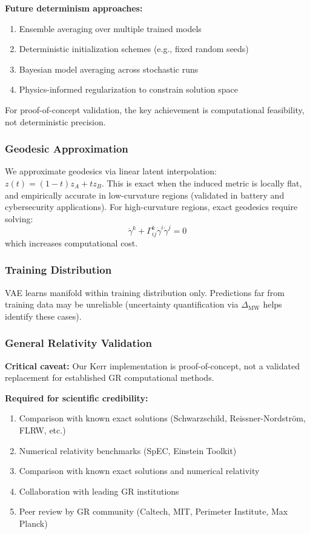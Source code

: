 \documentclass[11pt,a4paper]{article}
\begin{document}
\textbf{Future determinism approaches:}
\begin{enumerate}
\item Ensemble averaging over multiple trained models
\item Deterministic initialization schemes (e.g., fixed random seeds)
\item Bayesian model averaging across stochastic runs
\item Physics-informed regularization to constrain solution space
\end{enumerate}

For proof-of-concept validation, the key achievement is computational feasibility, not deterministic precision.

\subsubsection{Geodesic Approximation}

We approximate geodesics via linear latent interpolation: $z(t) = (1-t)z_A + tz_B$. This is exact when the induced metric is locally flat, and empirically accurate in low-curvature regions (validated in battery and cybersecurity applications). For high-curvature regions, exact geodesics require solving:
\begin{equation}
\ddot{\gamma}^k + \Gamma^k_{ij}\dot{\gamma}^i\dot{\gamma}^j = 0
\end{equation}
which increases computational cost.

\subsubsection{Training Distribution}

VAE learns manifold within training distribution only. Predictions far from training data may be unreliable (uncertainty quantification via $\Delta_{\text{MW}}$ helps identify these cases).

\subsubsection{General Relativity Validation}

\textbf{Critical caveat:} Our Kerr implementation is proof-of-concept, not a validated replacement for established GR computational methods.

\textbf{Required for scientific credibility:}
\begin{enumerate}
\item Comparison with known exact solutions (Schwarzschild, Reissner-Nordström, FLRW, etc.)
\item Numerical relativity benchmarks (SpEC, Einstein Toolkit)
\item Comparison with known exact solutions and numerical relativity
\item Collaboration with leading GR institutions
\item Peer review by GR community (Caltech, MIT, Perimeter Institute, Max Planck)
\end{enumerate}
\end{document}
